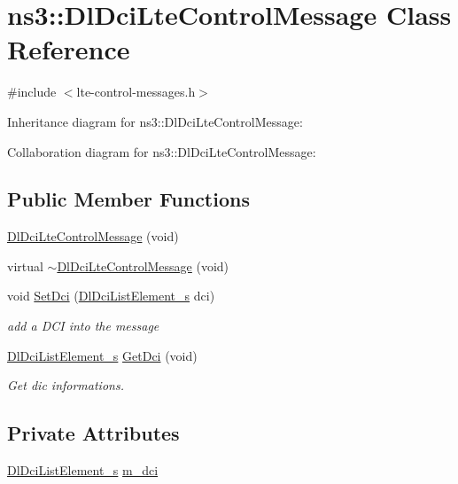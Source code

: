 \hypertarget{classns3_1_1DlDciLteControlMessage}{}\section{ns3\+:\+:Dl\+Dci\+Lte\+Control\+Message Class Reference}
\label{classns3_1_1DlDciLteControlMessage}


{\ttfamily \#include $<$lte-\/control-\/messages.\+h$>$}



Inheritance diagram for ns3\+:\+:Dl\+Dci\+Lte\+Control\+Message\+:


Collaboration diagram for ns3\+:\+:Dl\+Dci\+Lte\+Control\+Message\+:
\subsection*{Public Member Functions}
\begin{DoxyCompactItemize}
\item 
\hyperlink{classns3_1_1DlDciLteControlMessage_aa215e92db0b71c2e7c0109692654a7e4}{Dl\+Dci\+Lte\+Control\+Message} (void)
\item 
virtual \hyperlink{classns3_1_1DlDciLteControlMessage_a1e00bd41d4c8372c29df0e373d1691ce}{$\sim$\+Dl\+Dci\+Lte\+Control\+Message} (void)
\item 
void \hyperlink{classns3_1_1DlDciLteControlMessage_a4920a5f0de6f6d6c220166467d84428e}{Set\+Dci} (\hyperlink{structns3_1_1DlDciListElement__s}{Dl\+Dci\+List\+Element\+\_\+s} dci)
\begin{DoxyCompactList}\small\item\em add a D\+CI into the message \end{DoxyCompactList}\item 
\hyperlink{structns3_1_1DlDciListElement__s}{Dl\+Dci\+List\+Element\+\_\+s} \hyperlink{classns3_1_1DlDciLteControlMessage_abbe7c5ed8e9e689d2786d02774a017a3}{Get\+Dci} (void)
\begin{DoxyCompactList}\small\item\em Get dic informations. \end{DoxyCompactList}\end{DoxyCompactItemize}
\subsection*{Private Attributes}
\begin{DoxyCompactItemize}
\item 
\hyperlink{structns3_1_1DlDciListElement__s}{Dl\+Dci\+List\+Element\+\_\+s} \hyperlink{classns3_1_1DlDciLteControlMessage_ac8034e211d687a57e24c580e9d8ffc92}{m\+\_\+dci}
\end{DoxyCompactItemize}
